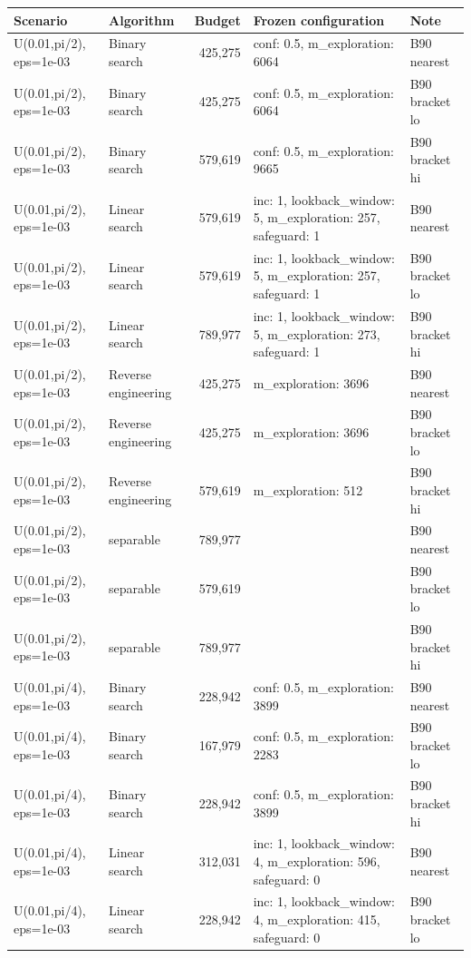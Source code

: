 \begin{tabular}{llrll}
\toprule
Scenario & Algorithm & Budget & Frozen configuration & Note \\
\midrule
U(0.01,pi/2), eps=1e-03 & Binary search & 425,275 & conf: 0.5, m\_exploration: 6064 & B90 nearest \\
U(0.01,pi/2), eps=1e-03 & Binary search & 425,275 & conf: 0.5, m\_exploration: 6064 & B90 bracket lo \\
U(0.01,pi/2), eps=1e-03 & Binary search & 579,619 & conf: 0.5, m\_exploration: 9665 & B90 bracket hi \\
U(0.01,pi/2), eps=1e-03 & Linear search & 579,619 & inc: 1, lookback\_window: 5, m\_exploration: 257, safeguard: 1 & B90 nearest \\
U(0.01,pi/2), eps=1e-03 & Linear search & 579,619 & inc: 1, lookback\_window: 5, m\_exploration: 257, safeguard: 1 & B90 bracket lo \\
U(0.01,pi/2), eps=1e-03 & Linear search & 789,977 & inc: 1, lookback\_window: 5, m\_exploration: 273, safeguard: 1 & B90 bracket hi \\
U(0.01,pi/2), eps=1e-03 & Reverse engineering & 425,275 & m\_exploration: 3696 & B90 nearest \\
U(0.01,pi/2), eps=1e-03 & Reverse engineering & 425,275 & m\_exploration: 3696 & B90 bracket lo \\
U(0.01,pi/2), eps=1e-03 & Reverse engineering & 579,619 & m\_exploration: 512 & B90 bracket hi \\
U(0.01,pi/2), eps=1e-03 & separable & 789,977 &  & B90 nearest \\
U(0.01,pi/2), eps=1e-03 & separable & 579,619 &  & B90 bracket lo \\
U(0.01,pi/2), eps=1e-03 & separable & 789,977 &  & B90 bracket hi \\
U(0.01,pi/4), eps=1e-03 & Binary search & 228,942 & conf: 0.5, m\_exploration: 3899 & B90 nearest \\
U(0.01,pi/4), eps=1e-03 & Binary search & 167,979 & conf: 0.5, m\_exploration: 2283 & B90 bracket lo \\
U(0.01,pi/4), eps=1e-03 & Binary search & 228,942 & conf: 0.5, m\_exploration: 3899 & B90 bracket hi \\
U(0.01,pi/4), eps=1e-03 & Linear search & 312,031 & inc: 1, lookback\_window: 4, m\_exploration: 596, safeguard: 0 & B90 nearest \\
U(0.01,pi/4), eps=1e-03 & Linear search & 228,942 & inc: 1, lookback\_window: 4, m\_exploration: 415, safeguard: 0 & B90 bracket lo \\

\end{tabular}
